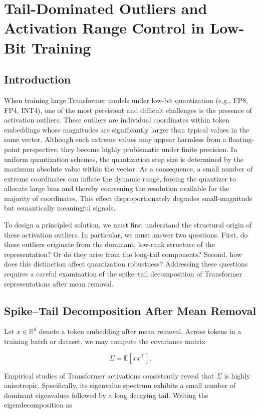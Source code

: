 \chapter{Tail-Dominated Outliers and Activation Range Control in Low-Bit Training}

\section{Introduction}

When training large Transformer models under low-bit quantization (e.g., FP8, FP4, INT4), one of the most persistent and difficult challenges is the presence of activation outliers. These outliers are individual coordinates within token embeddings whose magnitudes are significantly larger than typical values in the same vector. Although such extreme values may appear harmless from a floating-point perspective, they become highly problematic under finite precision. In uniform quantization schemes, the quantization step size is determined by the maximum absolute value within the vector. As a consequence, a small number of extreme coordinates can inflate the dynamic range, forcing the quantizer to allocate large bins and thereby coarsening the resolution available for the majority of coordinates. This effect disproportionately degrades small-magnitude but semantically meaningful signals.

To design a principled solution, we must first understand the structural origin of these activation outliers. In particular, we must answer two questions. First, do these outliers originate from the dominant, low-rank structure of the representation? Or do they arise from the long-tail components? Second, how does this distinction affect quantization robustness? Addressing these questions requires a careful examination of the spike–tail decomposition of Transformer representations after mean removal.

\section{Spike–Tail Decomposition After Mean Removal}

Let $x \in \mathbb{R}^d$ denote a token embedding after mean removal. Across tokens in a training batch or dataset, we may compute the covariance matrix

\[
\Sigma = \mathbb{E}[x x^\top].
\]

Empirical studies of Transformer activations consistently reveal that $\Sigma$ is highly anisotropic. Specifically, its eigenvalue spectrum exhibits a small number of dominant eigenvalues followed by a long decaying tail. Writing the eigendecomposition as

